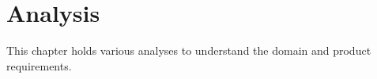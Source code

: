 \chapter{Analysis}
This chapter holds various analyses to understand the domain and product requirements.








